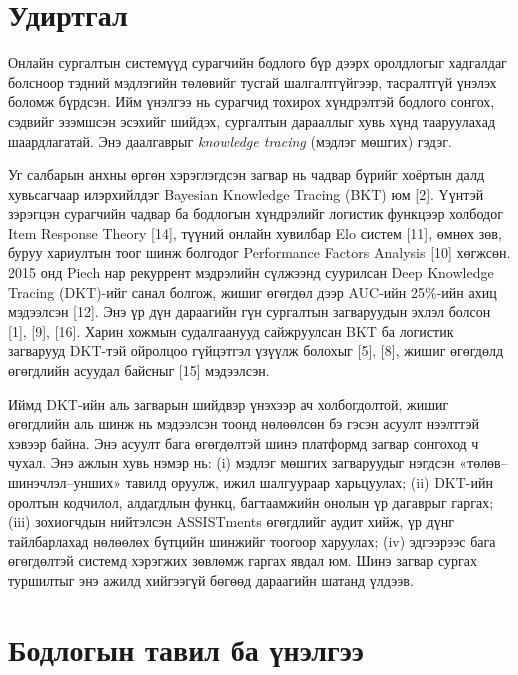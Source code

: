 \documentclass[10pt,twocolumn]{article}
\begin{document}
\section{Удиртгал}

Онлайн сургалтын системүүд сурагчийн бодлого бүр дээрх оролдлогыг хадгалдаг болсноор тэдний
мэдлэгийн төлөвийг тусгай шалгалтгүйгээр, тасралтгүй үнэлэх боломж бүрдсэн. Ийм үнэлгээ нь
сурагчид тохирох хүндрэлтэй бодлого сонгох, сэдвийг эзэмшсэн эсэхийг шийдэх, сургалтын
дарааллыг хувь хүнд тааруулахад шаардлагатай. Энэ даалгаврыг \emph{knowledge tracing} (мэдлэг
мөшгих) гэдэг.

Уг салбарын анхны өргөн хэрэглэгдсэн загвар нь чадвар бүрийг хоёртын далд хувьсагчаар
илэрхийлдэг Bayesian Knowledge Tracing (BKT) юм [2]. Үүнтэй зэрэгцэн сурагчийн чадвар ба
бодлогын хүндрэлийг логистик функцээр холбодог Item Response Theory [14], түүний онлайн хувилбар
Elo систем [11], өмнөх зөв, буруу хариултын тоог шинж болгодог Performance Factors Analysis
[10] хөгжсөн. 2015 онд Piech нар рекуррент мэдрэлийн сүлжээнд суурилсан Deep Knowledge Tracing
(DKT)-ийг санал болгож, жишиг өгөгдөл дээр AUC-ийн 25\%-ийн ахиц мэдээлсэн [12]. Энэ үр дүн
дараагийн гүн сургалтын загваруудын эхлэл болсон [1], [9], [16]. Харин хожмын судалгаанууд
сайжруулсан BKT ба логистик загварууд DKT-тэй ойролцоо гүйцэтгэл үзүүлж болохыг [5], [8],
жишиг өгөгдөлд өгөгдлийн асуудал байсныг [15] мэдээлсэн.

Иймд DKT-ийн аль загварын шийдвэр үнэхээр ач холбогдолтой, жишиг өгөгдлийн аль шинж нь
мэдээлсэн тоонд нөлөөлсөн бэ гэсэн асуулт нээлттэй хэвээр байна. Энэ асуулт бага өгөгдөлтэй
шинэ платформд загвар сонгоход ч чухал. Энэ ажлын хувь нэмэр нь: (i) мэдлэг мөшгих загваруудыг
нэгдсэн «төлөв–шинэчлэл–унших» тавилд оруулж, ижил шалгуураар харьцуулах; (ii) DKT-ийн оролтын
кодчилол, алдагдлын функц, багтаамжийн онолын үр дагаврыг гаргах; (iii) зохиогчдын нийтэлсэн
ASSISTments өгөгдлийг аудит хийж, үр дүнг тайлбарлахад нөлөөлөх бүтцийн шинжийг тоогоор
харуулах; (iv) эдгээрээс бага өгөгдөлтэй системд хэрэгжих зөвлөмж гаргах явдал юм. Шинэ
загвар сургах туршилтыг энэ ажилд хийгээгүй бөгөөд дараагийн шатанд үлдээв.

\section{Бодлогын тавил ба үнэлгээ}
\end{document}
